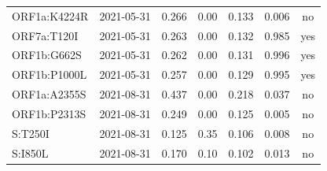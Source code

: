 \begin{longtable}{lrrrrrc}
ORF1a:K4224R & 2021-05-31 & 0.266 & 0.00 & 0.133 & 0.006 & no\\
ORF7a:T120I & 2021-05-31 & 0.263 & 0.00 & 0.132 & 0.985 & yes\\
ORF1b:G662S & 2021-05-31 & 0.262 & 0.00 & 0.131 & 0.996 & yes\\
ORF1b:P1000L & 2021-05-31 & 0.257 & 0.00 & 0.129 & 0.995 & yes\\
ORF1a:A2355S & 2021-08-31 & 0.437 & 0.00 & 0.218 & 0.037 & no\\
ORF1b:P2313S & 2021-08-31 & 0.249 & 0.00 & 0.125 & 0.005 & no\\
S:T250I & 2021-08-31 & 0.125 & 0.35 & 0.106 & 0.008 & no\\
S:I850L & 2021-08-31 & 0.170 & 0.10 & 0.102 & 0.013 & no\\
\bottomrule
\end{longtable}
